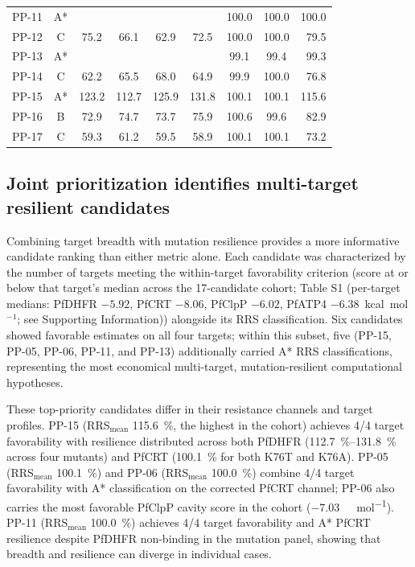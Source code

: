 \documentclass[11pt,a4paper]{article}
\begin{document}
\begin{table}[ht!]
\begin{tabular}{@{}lcccccccr@{}}
			PP-11 & A* & \textemdash & \textemdash & \textemdash & \textemdash & \num{100.0} & \num{100.0} & \num{100.0} \\
			PP-12 & C & \num{75.2} & \num{66.1} & \num{62.9} & \num{72.5} & \num{100.0} & \num{100.0} & \num{79.5} \\
			PP-13 & A* & \textemdash & \textemdash & \textemdash & \textemdash & \num{99.1} & \num{99.4} & \num{99.3} \\
			PP-14 & C & \num{62.2} & \num{65.5} & \num{68.0} & \num{64.9} & \num{99.9} & \num{100.0} & \num{76.8} \\
			PP-15 & A* & \num{123.2} & \num{112.7} & \num{125.9} & \num{131.8} & \num{100.1} & \num{100.1} & \num{115.6} \\
			PP-16 & B & \num{72.9} & \num{74.7} & \num{73.7} & \num{75.9} & \num{100.6} & \num{99.6} & \num{82.9} \\
			PP-17 & C & \num{59.3} & \num{61.2} & \num{59.5} & \num{58.9} & \num{100.1} & \num{100.1} & \num{73.2} \\
			\bottomrule
		\end{tabular}
	\end{table}
	
	\subsection{Joint prioritization identifies multi-target resilient candidates}\label{sec:results_joint}
	Combining target breadth with mutation resilience provides a more informative candidate ranking than either metric alone. Each candidate was characterized by the number of targets meeting the within-target favorability criterion (score at or below that target's median across the \num{17}-candidate cohort; Table S1 (per-target medians: PfDHFR $-5.92$, PfCRT $-8.06$, PfClpP $-6.02$, PfATP4 $-6.38$~kcal~mol$^{-1}$; see Supporting Information)) alongside its RRS classification. Six candidates showed favorable estimates on all four targets; within this subset, five (PP-15, PP-05, PP-06, PP-11, and PP-13) additionally carried A* RRS classifications, representing the most economical multi-target, mutation-resilient computational hypotheses.
	
	These top-priority candidates differ in their resistance channels and target profiles. PP-15 (RRS$_{\mathrm{mean}}$ \qty{115.6}{\percent}, the highest in the cohort) achieves \num{4}/\num{4} target favorability with resilience distributed across both PfDHFR (\qtyrange{112.7}{131.8}{\percent} across four mutants) and PfCRT (\qty{100.1}{\percent} for both K76T and K76A). PP-05 (RRS$_{\mathrm{mean}}$ \qty{100.1}{\percent}) and PP-06 (RRS$_{\mathrm{mean}}$ \qty{100.0}{\percent}) combine \num{4}/\num{4} target favorability with A* classification on the corrected PfCRT channel; PP-06 also carries the most favorable PfClpP cavity score in the cohort (\qty{-7.03}{\kilo\calorie\per\mol}). PP-11 (RRS$_{\mathrm{mean}}$ \qty{100.0}{\percent}) achieves \num{4}/\num{4} target favorability and A* PfCRT resilience despite PfDHFR non-binding in the mutation panel, showing that breadth and resilience can diverge in individual cases.
	
\end{document}
